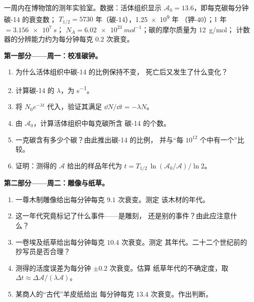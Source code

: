 \begin{problem}
\label{pb:g12:radioactive-decay:1}
一周内在博物馆的测年实验室。数据：活体组织显示
$\mathcal A_0 = 13.6$，即每克碳每分钟碳-14 的衰变数；
$T_{1/2} = \num{5730}$ 年（碳-14），\num{1.25e9} 年
（钾-40）；$1$ 年 $= \qty{3.156e7}{s}$；
$N_A = \qty{6.02e23}{mol^{-1}}$；碳的摩尔质量为 \qty{12}{g/mol}；
计数器的分辨能力约为每分钟每克 $0.2$ 次衰变。

\medskip
\noindent\textbf{第一部分——周一：校准碳钟。}
\begin{enumerate}
  \item 为什么活体组织中碳-14 的比例保持不变，
        死亡后又发生了什么变化？
  \item 计算碳-14 的 $\lambda$，为 \unit{s^{-1}}。
  \item 将 $N_0 e^{-\lambda t}$ 代入，验证其满足
        $\dd N/\dd t = -\lambda N$。
  \item 由 $\mathcal A_0$，计算活体组织中每克碳所含
        碳-14 的个数。
  \item 一克碳含有多少个碳？由此推出碳-14 的比例，
        并与“每 $10^{12}$ 个中有一个”比较。
  \item 证明：测得的 $\mathcal A$ 给出的样品年代为
        $t = T_{1/2}\,\ln(\mathcal A_0/\mathcal A)/\ln 2$。
\end{enumerate}

\medskip
\noindent\textbf{第二部分——周二：雕像与纸草。}
\begin{enumerate}[resume]
  \item 一尊木制雕像给出每分钟每克 $9.1$ 次衰变。测定
        该木材的年代。
  \item 这一年代究竟标记了什么事件——是雕刻，
        还是别的事件？由此应注意什么？
  \item 一卷埃及纸草给出每分钟每克 $10.4$ 次衰变。测定
        其年代。二十二个世纪前的抄写员是否合理？
  \item 测得的活度误差为每分钟 $\pm 0.2$ 次衰变。估算
        纸草年代的不确定度，取
        $\Delta t \approx \Delta\mathcal A/(\lambda \mathcal A)$。
  \item 某商人的“古代”羊皮纸给出
        每分钟每克 $13.4$ 次衰变。作出判断。
\end{enumerate}


\end{problem}
